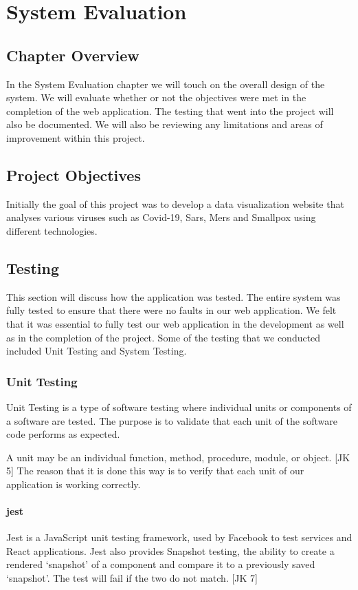 \chapter{System Evaluation}

\section{Chapter Overview}
In the System Evaluation chapter we will touch on the overall design of the system.
We will evaluate whether or not the objectives were met in the completion of the web application.
The testing that went into the project will also be documented.
We will also be reviewing any limitations and areas of improvement within this project.

\section{Project Objectives}
Initially the goal of this project was to develop a data visualization website that analyses various viruses such as Covid-19, Sars, Mers and Smallpox using different technologies.

\section{Testing}
This section will discuss how the application was tested.
The entire system was fully tested to ensure that there were no faults in our web application.
We felt that it was essential to fully test our web application in the development as well as in the completion of the project.
Some of the testing that we conducted included Unit Testing and System Testing.


\subsection{Unit Testing}
Unit Testing is a type of software testing where individual units or components of a software are tested. 
The purpose is to validate that each unit of the software code performs as expected.

A unit may be an individual function, method, procedure, module, or object. [JK 5]
The reason that it is done this way is to verify that each unit of our application is working correctly.


\subsubsection{jest}
Jest is a JavaScript unit testing framework, used by Facebook to test services and React applications.
Jest also provides Snapshot testing, the ability to create a rendered ‘snapshot’ of a component and compare it to a previously saved ‘snapshot’. The test will fail if the two do not match. [JK 7]

